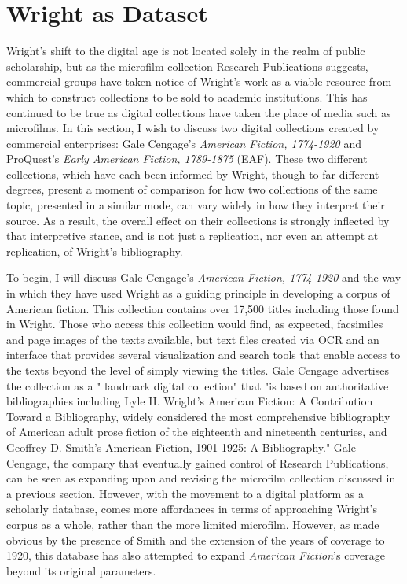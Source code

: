 \section{Wright as Dataset}
Wright's shift to the digital age is not located solely in the realm of public scholarship, but as the microfilm collection Research Publications suggests, commercial groups have taken notice of Wright's work as a viable resource from which to construct collections to be sold to academic institutions. This has continued to be true as digital collections have taken the place of media such as microfilms. In this section, I wish to discuss two digital collections created by commercial enterprises: Gale Cengage's \textit{American Fiction, 1774-1920} and ProQuest's \textit{Early American Fiction, 1789-1875} (EAF). These two different collections, which have each been informed by Wright, though to far different degrees, present a moment of comparison for how two collections of the same topic, presented in a similar mode, can vary widely in how they interpret their source. As a result, the overall effect on their collections is strongly inflected by that interpretive stance, and is not just a replication, nor even an attempt at replication, of Wright's bibliography. 

To begin, I will discuss Gale Cengage's \textit{American Fiction, 1774-1920} and the way in which they have used Wright as a guiding principle in developing a corpus of American fiction. This collection contains over 17,500 titles including those found in Wright. Those who access this collection would find, as expected, facsimiles and page images of the texts available, but text files created via OCR and an interface that provides several visualization and search tools that enable access to the texts beyond the level of simply viewing the titles. Gale Cengage advertises the collection as a " landmark digital collection" that "is based on authoritative bibliographies including Lyle H. Wright’s American Fiction: A Contribution Toward a Bibliography, widely considered the most comprehensive bibliography of American adult prose fiction of the eighteenth and nineteenth centuries, and Geoffrey D. Smith’s American Fiction, 1901-1925: A Bibliography." Gale Cengage, the company that eventually gained control of Research Publications, can be seen as expanding upon and revising the microfilm collection discussed in a previous section. However, with the movement to a digital platform as a scholarly database, comes more affordances in terms of approaching Wright's corpus as a whole, rather than the more limited microfilm. However, as made obvious by the presence of Smith and the extension of the years of coverage to 1920, this database has also attempted to expand \textit{American Fiction}'s coverage beyond its original parameters. 

